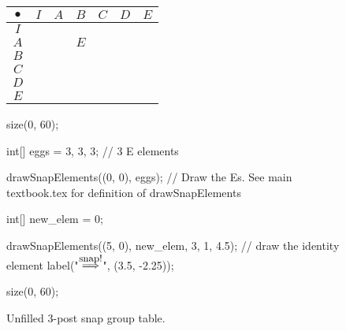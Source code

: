 \documentclass[../key.tex]{subfiles}
\begin{document}
\newcommand\snap{\bullet}

\begin{figure}[h]
	\begin{center}
		\begin{minipage}[b]{\textwidth}
			\centering
			\begin{tabular}{c|cccccc}
				\hline
				$\snap$ & $I$ & $A$ & $B$ & $C$ & $D$ & $E$ \\ \hline
				\rowcolor{light-gray}
				$I$    &   &   &   &   &   &   \\
				$A$    &   &   & $E$ &   &   &   \\
				\rowcolor{light-gray}
				$B$    &   &   &   &   &   &   \\
				$C$    &   &   &   &   &   &   \\
				\rowcolor{light-gray}
				$D$    &   &   &   &   &   &   \\
				$E$    &   &   &   &   &   &   \\ \hline
			\end{tabular}
			\vspace*{0.5\baselineskip}
		\end{minipage}
	\end{center}
	\vspace*{-2\baselineskip}
	\begin{center}
		\begin{minipage}[t]{\textwidth}
			\caption{Unfilled $3$-post snap group table.}
			\label{fig:sbstable_CHANG}
		\end{minipage}
	\end{center}

	\begin{center}
		\begin{minipage}[b]{.45\textwidth}
			\centering
			\begin{asy}
				size(0, 60);

				int[] eggs = {3, 3, 3}; // 3 E elements

				drawSnapElements((0, 0), eggs); // Draw the Es. See main textbook.tex for definition of drawSnapElements

				int[] new_elem = {0};

				drawSnapElements((5, 0), new_elem, 3, 1, 4.5); // draw the identity element
				label("$\stackrel{\mbox{\small snap!}}{\Longrightarrow}$", (3.5, -2.25));
			\end{asy}
		\end{minipage}
		\hfill
		\begin{minipage}[b]{.45\textwidth}
			\centering
			\begin{asy}
				size(0, 60);


\end{asy}
\end{minipage}
\end{center}
\end{figure}
\end{document}
